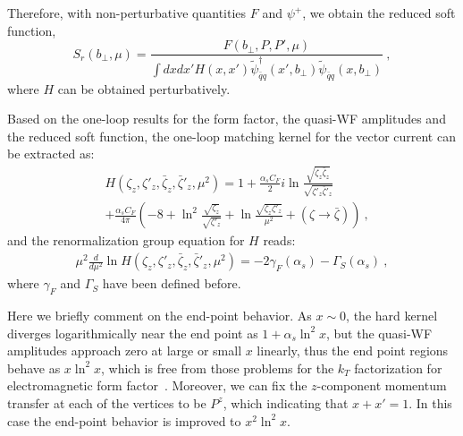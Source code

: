 Therefore, with non-perturbative quantities $F$ and $\psi^+$, we obtain the reduced soft function,
\begin{equation}
	S_{r}(b_\perp,\mu)=\frac{F(b_\perp,P,P',\mu)}{\int dx dx' H(x,x')\tilde \psi_{\bar q q}^{\dagger}(x',b_\perp)\tilde \psi_{\bar q q}(x,b_\perp)} \ ,
	\label{eq:form_qfac}
\end{equation}
where $H$ can be obtained perturbatively.

Based on the one-loop results for the form factor, the quasi-WF amplitudes and the reduced soft function, the one-loop matching kernel for the vector current can be extracted as:
\begin{align}
	&H(\zeta_z,\zeta'_z,\bar \zeta_z,\bar \zeta'_z,\mu^2)=1+ \frac{\alpha_sC_F}{2}i\ln \frac{\sqrt{\zeta_z\bar\zeta_z}}{\sqrt{\zeta'_z\bar\zeta'_z}}  \\
	&+\frac{\alpha_sC_F}{4\pi}\left(-8+\ln^2\frac{\sqrt{\zeta_z}}{\sqrt{\zeta'_z}}+\ln \frac{\sqrt{\zeta_z\zeta'_z}}{\mu^2}+(\zeta \rightarrow \bar \zeta)\right)\nonumber \ ,
\end{align}
and the renormalization group equation for $H$ reads:
\begin{align}
	\mu^2\frac{d}{d\mu^2}\ln H(\zeta_z,\zeta'_z,\bar \zeta_z,\bar \zeta'_z,\mu^2)=-2\gamma_F(\alpha_s)-\Gamma_{S}(\alpha_s) \ ,
\end{align}
where $\gamma_F$ and $\Gamma_S$ have been defined before.

Here we briefly comment on the end-point behavior. As $x\sim 0$, the hard kernel diverges logarithmically near the end point as $ 1+\alpha_s \ln^2 x$, but the quasi-WF amplitudes approach zero at large or small $x$ linearly, thus the end point regions behave as $x\ln^2 x$, which is free from those problems for the $k_T$ factorization for electromagnetic form factor~\cite{Li:1992nu}. Moreover, we can fix the $z$-component momentum transfer at each of the vertices to be $P^z$, which indicating that $x+x'=1$. In this case the end-point behavior is improved to $x^2\ln^2 x$.

